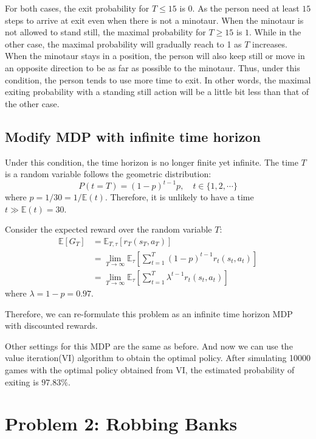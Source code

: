 \documentclass{article}
\begin{document}
For both cases, the exit probability for $T\leq 15$ is $0$. As the person need at least $15$ steps to arrive at exit even when there is not a minotaur.
When the minotaur is not allowed to stand still, the maximal probability for $T\geq 15$ is $1$. While in the other case, the maximal probability will gradually reach to 1 as $T$ increases.
When the minotaur stays in a position, the person will also keep still or move in an opposite direction to be as far as possible to the minotaur.
Thus, under this condition, the person tends to use more time to exit.
In other words, the maximal exiting probability with a standing still action will be a little bit less than that of the other case.

\subsection{Modify MDP with infinite time horizon}
Under this condition, the time horizon is no longer finite yet infinite.
The time $T$ is a random variable follows the geometric distribution:
\begin{equation*}
  P(t=T) = (1-p)^{t-1} p, \quad t \in \{1,2,\cdots\}
\end{equation*}
where $p=1 / 30 = 1 / \mathbb{E}(t)$. Therefore, it is unlikely to have a time $t \gg \mathbb{E}(t) = 30$.

Consider the expected reward over the random variable $T$:
\begin{align*}
  \mathbb{E}[G_{T}]
    &= \mathbb{E}_{T, \tau}[r_T(s_T, a_T)] \\
    &= \lim_{T\rightarrow\infty} \mathbb{E}_{\tau}\left[\sum_{t=1}^{T} (1-p)^{t-1} r_t(s_t, a_t)\right] \\
    &= \lim_{T\rightarrow\infty} \mathbb{E}_{\tau}\left[\sum_{t=1}^{T} \lambda^{t-1} r_t(s_t, a_t)\right]
\end{align*}
where $\lambda = 1- p = 0.97$.

Therefore, we can re-formulate this problem as an infinite time horizon MDP with discounted rewards.

Other settings for this MDP are the same as before. And now we can use the value iteration(VI) algorithm to obtain the optimal policy.
After simulating 10000 games with the optimal policy obtained from VI, the estimated probability of exiting is $97.83\%$.
\section{Problem 2: Robbing Banks}
\end{document}
